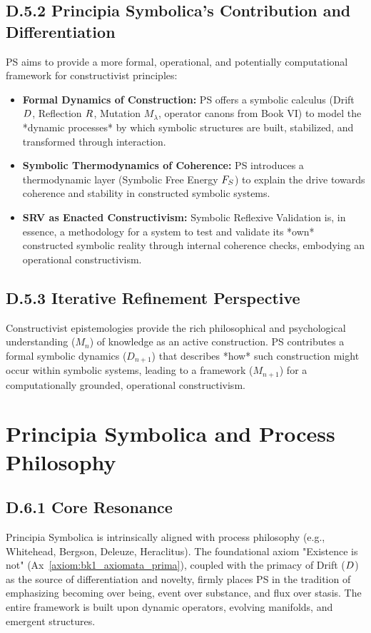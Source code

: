 \subsection*{D.5.2 Principia Symbolica's Contribution and Differentiation} \label{subsec:appD_constructivist_contribution_differentiation}
PS aims to provide a more formal, operational, and potentially computational framework for constructivist principles:
\begin{itemize}
    \item \textbf{Formal Dynamics of Construction:} PS offers a symbolic calculus (Drift \(D\), Reflection \(R\), Mutation \(M_\lambda\), operator canons from Book VI) to model the *dynamic processes* by which symbolic structures are built, stabilized, and transformed through interaction.
    \item \textbf{Symbolic Thermodynamics of Coherence:} PS introduces a thermodynamic layer (Symbolic Free Energy \(F_S\)) to explain the drive towards coherence and stability in constructed symbolic systems.
    \item \textbf{SRV as Enacted Constructivism:} Symbolic Reflexive Validation is, in essence, a methodology for a system to test and validate its *own* constructed symbolic reality through internal coherence checks, embodying an operational constructivism.
\end{itemize}
\subsection*{D.5.3 Iterative Refinement Perspective}
\label{subsec:appD_constructivist_iterative_refinement_perspective}
Constructivist epistemologies provide the rich philosophical and psychological understanding (\(M_n\)) of knowledge as an active construction. PS contributes a formal symbolic dynamics (\(D_{n+1}\)) that describes *how* such construction might occur within symbolic systems, leading to a framework (\(M_{n+1}\)) for a computationally grounded, operational constructivism.
\section*{Principia Symbolica and Process Philosophy} \label{sec:appD_ps_and_process_philosophy}
\subsection*{D.6.1 Core Resonance}
\label{subsec:appD_process_philosophy_core_resonance}
Principia Symbolica is intrinsically aligned with process philosophy \cite{whitehead1929} (e.g., Whitehead, Bergson, Deleuze, Heraclitus). The foundational axiom "Existence is not" (Ax~\ref{axiom:bk1_axiomata_prima}), coupled with the primacy of Drift (\(D\)) as the source of differentiation and novelty, firmly places PS in the tradition of emphasizing becoming over being, event over substance, and flux over stasis. The entire framework is built upon dynamic operators, evolving manifolds, and emergent structures.
